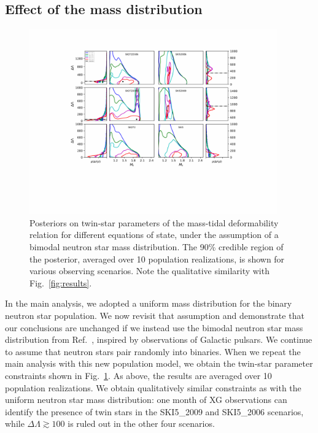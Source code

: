 \documentclass[aps,prd,twocolumn,superscriptaddress,nofootinbib]{revtex4-1}
\begin{document}
\subsection{Effect of the mass distribution}

\begin{figure}
    \centering
    \includegraphics[width=0.95\textwidth,trim={145 160 130 70},clip]{bimod-moneyplot_SK-legend.pdf}
    \caption{Posteriors on twin-star parameters of the mass-tidal deformability relation for different equations of state, under the assumption of a bimodal neutron star mass distribution. The 90\% credible region of the posterior, averaged over 10 population realizations, is shown for various observing scenarios. Note the qualitative similarity with Fig.~\ref{fig:results}.}
    \label{fig:bimod_results}
\end{figure}

In the main analysis, we adopted a uniform mass distribution for the binary neutron star population.
We now revisit that assumption and demonstrate that our conclusions are unchanged if we instead use the bimodal neutron star mass distribution from Ref.~\cite{FarrChatziioannou2020}, inspired by observations of Galactic pulsars. We continue to assume that neutron stars pair randomly into binaries.
When we repeat the main analysis with this new population model, we obtain the twin-star parameter constraints shown in Fig.~\ref{fig:bimod_results}.
As above, the results are averaged over 10 population realizations.
We obtain qualitatively similar constraints as with the uniform neutron star mass distribution: one month of XG observations can identify the presence of twin stars in the SKI5\_2009 and SKI5\_2006 scenarios, while $\Delta\Lambda \gtrsim 100$ is ruled out in the other four scenarios.
\end{document}
